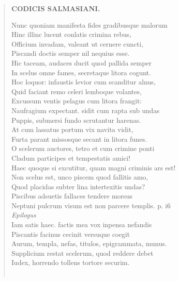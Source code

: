 \documentclass[11pt, a4paper]{report}
\begin{document}
\begin{verse}
    \begin{center} \textbf{CODICIS SALMASIANI.} \end{center} \marginpar{[95]} Nunc quoniam manifesta fides gradibusque malorum \\ Hinc illinc lucent conlatis crimina rebus, \\ Officium invadam, valeant ut cernere cuncti, \\ Piscandi doctis semper nil nequius esse. \\ Hic taceam, audaces ducit quod pallida semper \\ In scelus omne fames, secretaque litora cogunt. \\ Hoc loquor: infaustis levior cum scanditur alnus, \\ Quid faciant remo celeri lemboque volantes, \\ Excussum ventis pelagus cum litora frangit: \\ Naufragium expectant. sidit cum rapta sub undas \\ Puppis, submersi fundo scrutantur harenas. \\ At cum lassatus portum vix navita vidit, \\ Furta parant missosque secant in litora funes. \\ O scelerum auctores, tetro et cum crimine ponti \\ Cladum participes et tempestatis amici! \\ Haec quoque si excutitur, quam magni criminis ars est! \\ Non scelus est, unco piscem quod fallitis amo, \\ Quod placidas subter lina intertexitis undas? \\ Piscibus adsuetis fallaces tendere morsus \\ Neptuni pulcrum visum est non parcere templis. p. i6 \\ \textit{Epilogus} \\ Iam satis haec. factis  \lbrack mea \rbrack  vox inpensa nefandis \\ Piscantis facinus cecinit versuque coegit \\ Aurum, templa, nefas, titulos, epigrammata, munus. \\ Supplicium restat scelerum, quod reddere debet \\ Iudex, horrendo tollens tortore securim. \\ 
        ﻿\pagebreak 

\end{verse}
\end{document}
